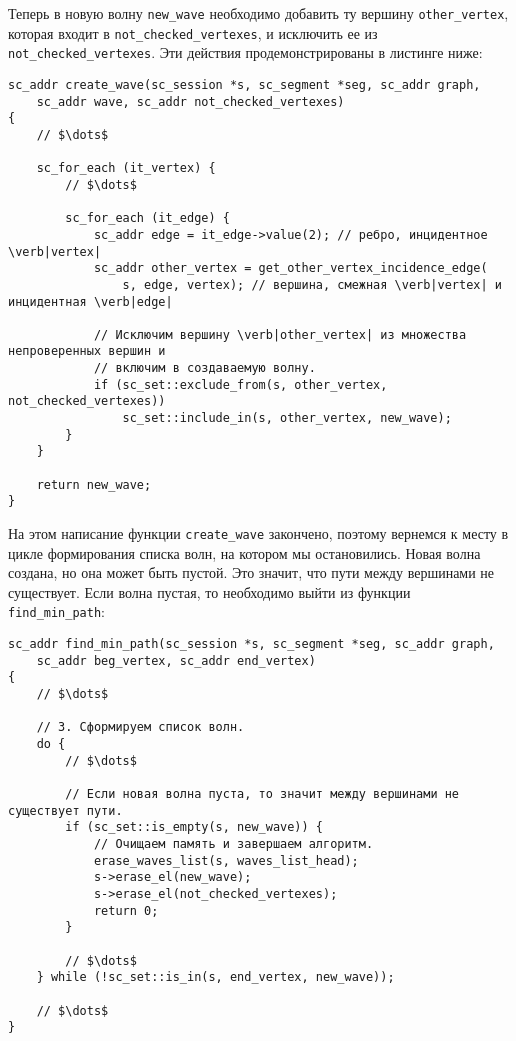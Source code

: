 Теперь в новую волну \lstinline|new_wave| необходимо добавить ту
вершину \lstinline|other_vertex|, которая входит в
\lstinline|not_checked_vertexes|, и исключить ее из
\lstinline|not_checked_vertexes|. Эти действия продемонстрированы в
листинге ниже:
\begin{lstlisting}[texcl]
sc_addr create_wave(sc_session *s, sc_segment *seg, sc_addr graph,
    sc_addr wave, sc_addr not_checked_vertexes)
{
    // $\dots$

    sc_for_each (it_vertex) {
        // $\dots$

        sc_for_each (it_edge) {
            sc_addr edge = it_edge->value(2); // ребро, инцидентное  \verb|vertex|
            sc_addr other_vertex = get_other_vertex_incidence_edge(
                s, edge, vertex); // вершина, смежная \verb|vertex| и инцидентная \verb|edge|

            // Исключим вершину \verb|other_vertex| из множества непроверенных вершин и
            // включим в создаваемую волну.
            if (sc_set::exclude_from(s, other_vertex, not_checked_vertexes))
                sc_set::include_in(s, other_vertex, new_wave);
        }
    }

    return new_wave;
}
\end{lstlisting}

На этом написание функции \lstinline|create_wave| закончено, поэтому
вернемся к месту в цикле формирования списка волн, на котором мы
остановились. Новая волна создана, но она может быть пустой. Это
значит, что пути между вершинами не существует. Если волна пустая, то
необходимо выйти из функции \lstinline|find_min_path|:
\begin{lstlisting}[texcl]
sc_addr find_min_path(sc_session *s, sc_segment *seg, sc_addr graph,
    sc_addr beg_vertex, sc_addr end_vertex)
{
    // $\dots$

    // 3. Сформируем список волн.
    do {
        // $\dots$

        // Если новая волна пуста, то значит между вершинами не существует пути.
        if (sc_set::is_empty(s, new_wave)) {
            // Очищаем память и завершаем алгоритм.
            erase_waves_list(s, waves_list_head);
            s->erase_el(new_wave);
            s->erase_el(not_checked_vertexes);
            return 0;
        }

        // $\dots$
    } while (!sc_set::is_in(s, end_vertex, new_wave));

    // $\dots$
}
\end{lstlisting}

